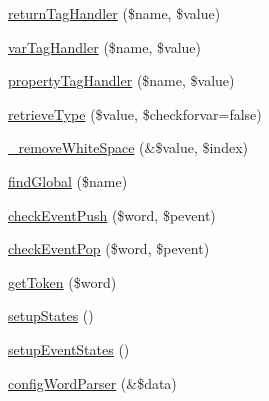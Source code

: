 \begin{DoxyCompactItemize}
\hyperlink{classphp_documentor_t_parser_a3f1393a72b540d3f62d3e84480e619d2}{return\-Tag\-Handler} (\$name, \$value)
\item 
\hyperlink{classphp_documentor_t_parser_aabc41000dbb16c9e2f3fc4750941906a}{var\-Tag\-Handler} (\$name, \$value)
\item 
\hyperlink{classphp_documentor_t_parser_a134c963747a4b65ebd261c6781b80ba5}{property\-Tag\-Handler} (\$name, \$value)
\item 
\hyperlink{classphp_documentor_t_parser_a510afa28e06e2f40492145c870473078}{retrieve\-Type} (\$value, \$checkforvar=false)
\item 
\hyperlink{classphp_documentor_t_parser_a38ffa698b86adeae050f35cab3c98e7b}{\-\_\-remove\-White\-Space} (\&\$value, \$index)
\item 
\hyperlink{classphp_documentor_t_parser_a5eca2ddca775674cafde6847674f3bdb}{find\-Global} (\$name)
\item 
\hyperlink{classphp_documentor_t_parser_a912ba83822697d200d7e2771166f6718}{check\-Event\-Push} (\$word, \$pevent)
\item 
\hyperlink{classphp_documentor_t_parser_a9f5347fcba49d2192e689e417671ce18}{check\-Event\-Pop} (\$word, \$pevent)
\item 
\hyperlink{classphp_documentor_t_parser_ae0490466fecabd48263d7c6801b3703d}{get\-Token} (\$word)
\item 
\hyperlink{classphp_documentor_t_parser_abe4d21ebe5f9d4088e7be4271603cd5e}{setup\-States} ()
\item 
\hyperlink{classphp_documentor_t_parser_a937f7ee10d9f69b406820a57dec6809d}{setup\-Event\-States} ()
\item 
\hyperlink{classphp_documentor_t_parser_a5b6d9473f683f7db254c4ce70cddaef8}{config\-Word\-Parser} (\&\$data)
\end{DoxyCompactItemize}
